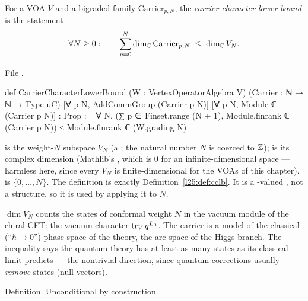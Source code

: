 \begin{definition}\label{l25:def:cclb}
For a VOA $V$ and a bigraded family $\mathrm{Carrier}_{p,N}$, the \emph{carrier character lower bound} is the
statement
\begin{equation*}
\forall N\ge0:\qquad \sum_{p=0}^{N}\dim_{\mathbb{C}}\mathrm{Carrier}_{p,N}\;\le\;\dim_{\mathbb{C}} V_N .
\end{equation*}
\end{definition}
\noindent File .
\begin{leancode}
def CarrierCharacterLowerBound (W : VertexOperatorAlgebra V)
    (Carrier : ℕ → ℕ → Type uC)
    [∀ p N, AddCommGroup (Carrier p N)]
    [∀ p N, Module ℂ (Carrier p N)] : Prop :=
  ∀ N,
    (∑ p ∈ Finset.range (N + 1), Module.finrank ℂ (Carrier p N)) ≤
      Module.finrank ℂ (W.grading N)
\end{leancode}
\begin{dictionary}
 is the weight-$N$ subspace $V_N$ (a ; the natural number $N$ is coerced to
${\mathbb{Z}}$);  is its complex dimension (Mathlib's , which is $0$ for an
infinite-dimensional space --- harmless here, since every $V_N$ is finite-dimensional for the VOAs of this
chapter).  is $\{0,\dots,N\}$. The definition is exactly
Definition~\ref{l25:def:cclb}. It is a -valued , not a structure, so it is used by
applying it to $N$.
\end{dictionary}
\begin{physics}
$\dim V_N$ counts the states of conformal weight $N$ in the vacuum module of the chiral CFT: the vacuum
character $\operatorname{tr}_V q^{L_0}$. The carrier is a model of the classical (``$\hbar\to0$'') phase space of the
theory, the arc space of the Higgs branch. The inequality says the quantum theory has at least as many
states as its classical limit predicts --- the nontrivial direction, since quantum corrections usually
\emph{remove} states (null vectors).
\end{physics}
\begin{status}
Definition. Unconditional by construction.
\end{status}

